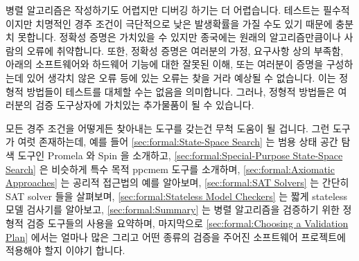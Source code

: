 
%


병렬 알고리즘은 작성하기도 어렵지만 디버깅 하기는 더 어렵습니다.
테스트는 필수적이지만 치명적인 경주 조건이 극단적으로 낮은 발생확률을 가질 수도
있기 때문에 충분치 못합니다.
정확성 증명은 가치있을 수 있지만 종국에는 원래의 알고리즘만큼이나 사람의 오류에
취약합니다.
또한, 정확성 증명은 여러분의 가정, 요구사항 상의 부족함, 아래의 소프트웨어와
하드웨어 기능에 대한 잘못된 이해, 또는 여러분이 증명을 구성하는데 있어 생각치
않은 오류 등에 있는 오류는 찾을 거라 예상될 수 없습니다.
이는 정형적 방법들이 테스트를 대체할 수는 없음을 의미합니다.
그러나, 정형적 방법들은 여러분의 검증 도구상자에 가치있는 추가물품이 될 수
있습니다.

\iffalse

Parallel algorithms can be hard to write, and even harder to debug.
Testing, though essential, is insufficient, as fatal race conditions
can have extremely low probabilities of occurrence.
Proofs of correctness can be valuable, but in the end are just as
prone to human error as is the original algorithm.
In addition, a proof of correctness cannot be expected to find errors
in your assumptions, shortcomings in the requirements,
misunderstandings of the underlying software or hardware primitives,
or errors that you did not think to construct a proof for.
This means that formal methods can never replace testing.
Nevertheless, formal methods can be a valuable addition to your validation
toolbox.

\fi

모든 경주 조건을 어떻게든 찾아내는 도구를 갖는건 무척 도움이 될 겁니다.
그런 도구가 여럿 존재하는데, 예를 들어
\cref{sec:formal:State-Space Search} 는 범용 상태 공간 탐색 도구인 Promela 와
Spin 을 소개하고,
\cref{sec:formal:Special-Purpose State-Space Search}
은 비슷하게 특수 목적 ppcmem 도구를 소개하며,
\cref{sec:formal:Axiomatic Approaches}
는 공리적 접근법의 예를 알아보며,
\cref{sec:formal:SAT Solvers}
는 간단히 SAT solver 들을 살펴보며,
\cref{sec:formal:Stateless Model Checkers}
는 짧게 stateless 모델 검사기를 알아보고,
\cref{sec:formal:Summary}
는 병렬 알고리즘을 검증하기 위한 정형적 검증 도구들의 사용을 요약하며,
마지막으로
\cref{sec:formal:Choosing a Validation Plan}
에서는 얼마나 많은 그리고 어떤 종류의 검증을 주어진 소프트웨어 프로젝트에
적용해야 할지 이야기 합니다.

